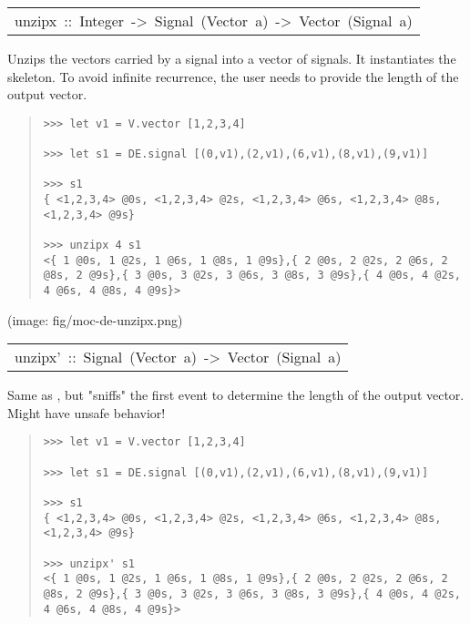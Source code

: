 \begin{haddockdesc}
\item[\begin{tabular}{@{}l}
unzipx\ ::\ Integer\ ->\ Signal\ (Vector\ a)\ ->\ Vector\ (Signal\ a)
\end{tabular}]\haddockbegindoc
Unzips the vectors carried by a signal into a vector of
 signals. It instantiates the 
 skeleton. To avoid infinite recurrence, the user needs to provide
 the length of the output vector.\par
\begin{quote}
{\haddockverb\begin{verbatim}
>>> let v1 = V.vector [1,2,3,4]

>>> let s1 = DE.signal [(0,v1),(2,v1),(6,v1),(8,v1),(9,v1)]

>>> s1
{ <1,2,3,4> @0s, <1,2,3,4> @2s, <1,2,3,4> @6s, <1,2,3,4> @8s, <1,2,3,4> @9s}

>>> unzipx 4 s1
<{ 1 @0s, 1 @2s, 1 @6s, 1 @8s, 1 @9s},{ 2 @0s, 2 @2s, 2 @6s, 2 @8s, 2 @9s},{ 3 @0s, 3 @2s, 3 @6s, 3 @8s, 3 @9s},{ 4 @0s, 4 @2s, 4 @6s, 4 @8s, 4 @9s}>

\end{verbatim}}
\end{quote}(image: fig/moc-de-unzipx.png)\par
           
\end{haddockdesc}
\begin{haddockdesc}
\item[\begin{tabular}{@{}l}
unzipx'\ ::\ Signal\ (Vector\ a)\ ->\ Vector\ (Signal\ a)
\end{tabular}]\haddockbegindoc
Same as , but "sniffs" the first event to determine the length of the output vector. Might have unsafe behavior!\par
\begin{quote}
{\haddockverb\begin{verbatim}
>>> let v1 = V.vector [1,2,3,4]

>>> let s1 = DE.signal [(0,v1),(2,v1),(6,v1),(8,v1),(9,v1)]

>>> s1
{ <1,2,3,4> @0s, <1,2,3,4> @2s, <1,2,3,4> @6s, <1,2,3,4> @8s, <1,2,3,4> @9s}

>>> unzipx' s1
<{ 1 @0s, 1 @2s, 1 @6s, 1 @8s, 1 @9s},{ 2 @0s, 2 @2s, 2 @6s, 2 @8s, 2 @9s},{ 3 @0s, 3 @2s, 3 @6s, 3 @8s, 3 @9s},{ 4 @0s, 4 @2s, 4 @6s, 4 @8s, 4 @9s}>

\end{verbatim}}
\end{quote}
\end{haddockdesc}
